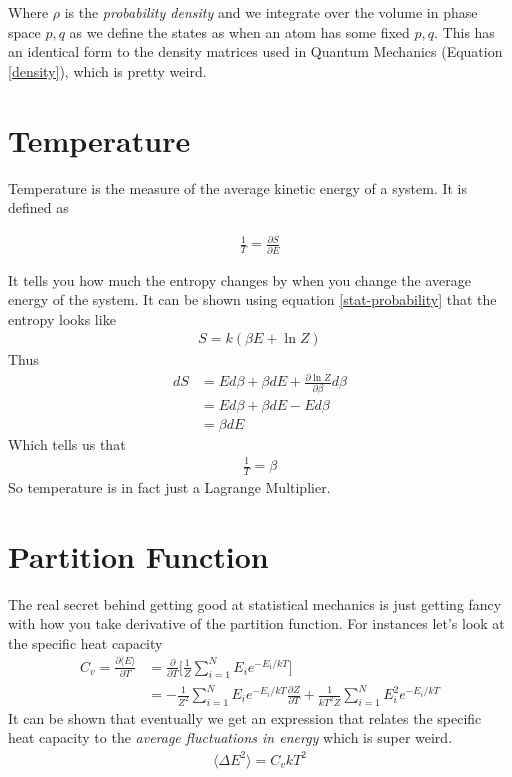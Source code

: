 Where $\rho$ is the \emph{probability density} and we integrate over the volume in phase space $p,q$ as we define the states as when an atom has some fixed $p, q$. This has an identical form to the density matrices  used in Quantum Mechanics (Equation \ref{density}), which is pretty weird.




\section{Temperature}
Temperature is the measure of the average kinetic energy of a system. It is defined as 

\begin{align}
\frac{1}{T}= \frac{\partial S}{\partial E}
\end{align}

It tells you how much the entropy changes by when you change the average energy of the system. It can be shown using equation \ref{stat-probability} that the entropy looks like
\begin{align}
S = k(\beta E + \ln Z)
\end{align}
Thus
\begin{align}
dS &= Ed\beta + \beta dE +\frac{\partial \ln Z}{\partial \beta}d\beta\\
&= Ed\beta + \beta dE -Ed\beta\\
&= \beta dE
\end{align}
Which tells us that
\begin{align}
\frac{1}{T} = \beta
\end{align}
So temperature is in fact just a Lagrange Multiplier.


\section{Partition Function}
The real secret behind getting good at statistical mechanics is just getting fancy with how you take derivative of the partition function. For instances let's look at the specific heat capacity
\begin{align}
    C_v = \frac{\partial \langle E\rangle}{\partial T} &= \frac{\partial}{\partial T}\Big[\frac{1}{Z}\sum_{i=1}^N E_i e^{-E_i/kT}\Big]\\
    &= -\frac{1}{Z^2}\sum_{i=1}^N E_i e^{-E_i/kT}\frac{\partial Z}{\partial T} + \frac{1}{kT^2Z}\sum_{i=1}^N E_i^2 e^{-E_i/kT}
\end{align}
It can be shown that eventually we get an expression that relates the specific heat capacity to the \emph{average fluctuations in energy} which is super weird.
\begin{align}
    \langle \Delta E^2\rangle= C_vkT^2 
\end{align}

